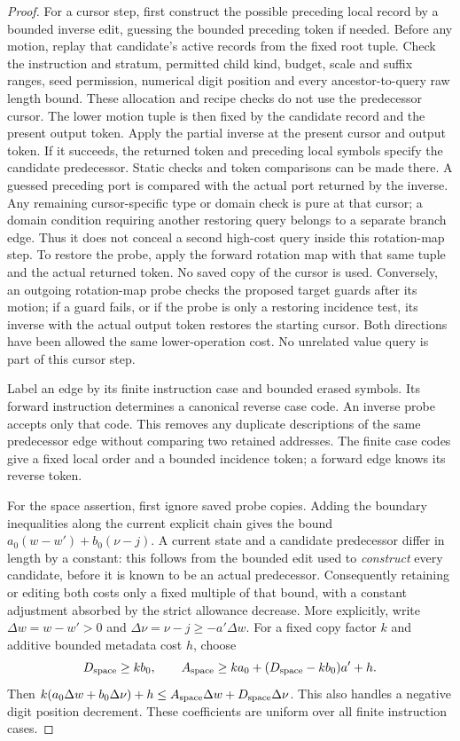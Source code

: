 \begin{proof}
For a cursor step, first construct the possible preceding local record
by a bounded inverse edit, guessing the bounded preceding token if
needed.  Before any motion, replay that candidate's active records from
the fixed root tuple.  Check the instruction and stratum, permitted
child kind, budget, scale and suffix ranges, seed permission, numerical
digit position and every ancestor-to-query raw length bound.  These allocation
and recipe checks do not use the predecessor cursor.  The lower motion
tuple is then fixed by the candidate record and the present output
token.  Apply the partial inverse at the present cursor
and output token.  If it succeeds, the returned token and preceding
local symbols specify the candidate predecessor.  Static checks and
token comparisons can be made there.
A guessed preceding port is compared with the actual port returned by
the inverse.  Any remaining cursor-specific type or domain check is
pure at that cursor; a domain condition requiring another restoring
query belongs to a separate branch edge.  Thus it does not conceal a
second high-cost query inside this rotation-map step.
To restore the probe, apply the
forward rotation map with that same tuple and the actual returned token.
No saved copy of the cursor is used.  Conversely, an outgoing rotation-map
probe checks the proposed target guards after its motion; if a guard
fails, or if the probe is only a restoring incidence test, its inverse
with the actual output token restores the starting cursor.  Both
directions have been allowed
the same lower-operation cost.  No unrelated value query is part of
this cursor step.

Label an edge by its finite instruction case and bounded erased
symbols.  Its forward instruction determines a canonical reverse case
code.  An inverse probe accepts only that code.  This removes any
duplicate descriptions of the same predecessor edge without comparing
two retained addresses.  The finite case codes give a fixed local order
and a bounded incidence token; a forward edge knows its reverse token.

For the space assertion, first ignore saved probe copies.  Adding the
boundary inequalities along the current explicit chain gives the bound
$a_0(w-w')+b_0(\nu-j)$.  A current state and a candidate predecessor differ in
length by a constant: this follows from the bounded edit used to
\emph{construct} every candidate, before it is known to be an actual
predecessor.  Consequently retaining or editing both costs only a fixed
multiple of that bound, with a constant adjustment absorbed by the
strict allowance decrease.  More explicitly, write
$\Delta w=w-w'>0$ and $\Delta \nu=\nu-j\ge-a'\Delta w$.  For a fixed copy
factor $k$ and additive bounded metadata cost $h$, choose
\begin{equation}\label{eq:ctrl-copy-coefficients}
 D_{\rm space}\ge kb_0,\qquad A_{\rm space}\ge ka_0+(D_{\rm space}-kb_0)a'+h.
\end{equation}
Then $k(a_0\Delta w+b_0\Delta \nu)+h\le A_{\rm space}\Delta w+D_{\rm space}\Delta \nu$.
This also handles a negative digit position decrement.  These coefficients are
uniform over all finite instruction cases.


\end{proof}
